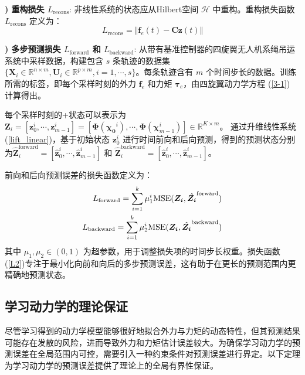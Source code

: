 \documentclass[lang=chs, degree=master, blindreview=false, winfonts=true]{yanputhesis}
\begin{document}
\textbf{) 重构损失 $L_{\text{recons}}$}: 非线性系统的状态应从Hilbert空间 $\mathcal{H}$ 中重构。重构损失函数 $L_{\text{recons}}$ 定义为：
\begin{equation}
	L_{\text{recons}}=\Vert \bm{f}_e(t) - \bm{C} \bm{z}(t) \Vert
\end{equation}

\textbf{) 多步预测损失 $L_{\text{forward}}$ 和 $L_{\text{backward}}$}: 从带有基准控制器的四旋翼无人机系绳吊运系统中采样数据，构建包含 $s$ 条轨迹的数据集 $\{\bm{X}_i \in \mathbb{R}^{n\times m}, \bm{U}_i \in \mathbb{R}^{p \times m}, i=1,\cdots,s\}$。每条轨迹含有 $m$ 个时间步长的数据。训练所需的标签，即每个采样时刻的外力 $\bm{f}_e$ 和力矩 $\bm{\tau}_e$，由四旋翼动力学方程 (\ref{3-1}) 计算得出。

每个采样时刻的+状态可以表示为 $\bm{Z}_i = [\bm{z}_0^i,\cdots,\bm{z}_{m-1}^i]=[\bm{\Phi}(\bm{\chi_{0}}^i),\cdots,\bm{\Phi}(\bm{\chi}_{m-1}^i)]\in \mathbb{R}^{K\times m}$。
通过升维线性系统(\ref{lift_linear})，基于初始状态 $\bm{z}_0^i$ 进行时间前向和后向预测，得到的预测状态分别为$\hat{\bm{Z}}_i^{\text{forward}} = [\hat{\bm{z}}_0^i, \cdots, \hat{\bm{z}}_{m-1}^i]$ 和 $\hat{\bm{Z}}_i^{\text{backward}} = [\hat{\bm{z}}_0^i, \cdots, \hat{\bm{z}}_{m-1}^i]$。


前向和后向预测误差的损失函数定义为：
\begin{equation}
	\begin{aligned}
		L_{\text{forward}} = \sum_{i=1}^{k} \mu_1^{i} {\rm MSE}(\bm{Z_{i}},\hat{\bm{Z_{i}}}^{\text{forward}})  \\
		L_{\text{backward}} = \sum_{i=1}^{k} \mu_2^{i} {\rm MSE}(\bm{Z_{i}},\hat{\bm{Z_{i}}}^{\text{backward}})\label{L2}
	\end{aligned}
\end{equation}
其中 $\mu_1,\mu_2 \in(0,1)$ 为超参数，用于调整损失项的时间步长权重。损失函数(\ref{L2})专注于最小化向前和向后的多步预测误差，这有助于在更长的预测范围内更精确地预测状态。

\subsection{学习动力学的理论保证}
尽管学习得到的动力学模型能够很好地拟合外力与力矩的动态特性，但其预测结果可能存在发散的风险，进而导致外力和力矩估计误差较大。为确保学习动力学的预测误差在全局范围内可控，需要引入一种约束条件对预测误差进行界定。以下定理为学习动力学的预测误差提供了理论上的全局有界性保证。
\end{document}
